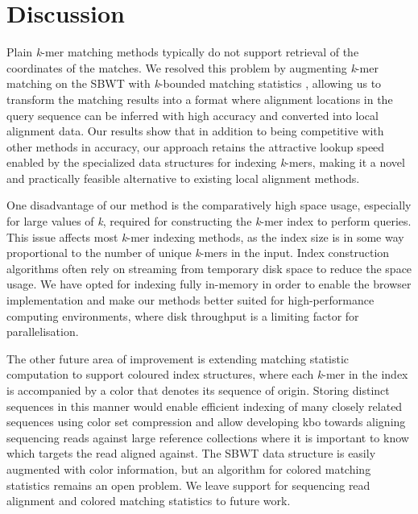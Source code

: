 \documentclass[unnumsec,webpdf,contemporary,large]{oup-authoring-template}%
\theoremstyle{thmstyleone}%
\theoremstyle{thmstyletwo}%
\theoremstyle{thmstylethree}%
\begin{document}
\section{Discussion}

Plain \emph{k}-mer matching methods typically do not support retrieval of the coordinates of the matches. We resolved this problem by augmenting \emph{k}-mer matching on the SBWT \cite{alanko2023small} with \emph{k}-bounded matching statistics \cite{alanko2023longest,alanko2024finimizers}, allowing us to transform the matching results into a format where alignment locations in the query sequence can be inferred with high accuracy and converted into local alignment data. Our results show that in addition to being competitive with other methods in accuracy, our approach retains the attractive lookup speed enabled by the specialized data structures for indexing \emph{k}-mers, making it a novel and practically feasible alternative to existing local alignment methods.

One disadvantage of our method is the comparatively high space usage, especially for large values of \emph{k}, required for constructing the \emph{k}-mer index to perform queries. This issue affects most \emph{k}-mer indexing methods, as the index size is in some way proportional to the number of unique \emph{k}-mers in the input. Index construction algorithms often rely on streaming from temporary disk space to reduce the space usage. We have opted for indexing fully in-memory in order to enable the browser implementation and make our methods better suited for high-performance computing environments, where disk throughput is a limiting factor for parallelisation.

The other future area of improvement is extending matching statistic computation to support coloured index structures, where each \emph{k}-mer in the index is accompanied by a color that denotes its sequence of origin. Storing distinct sequences in this manner would enable efficient indexing of many closely related sequences using color set compression and allow developing {\sf kbo} towards aligning sequencing reads against large reference collections where it is important to know which targets the read aligned against. The SBWT data structure is easily augmented with color information, but an algorithm for colored matching statistics remains an open problem. We leave support for sequencing read alignment and colored matching statistics to future work.
\end{document}
